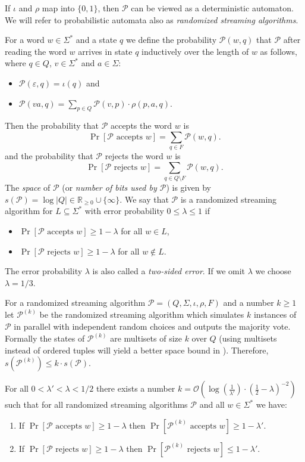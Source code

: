 \documentclass{article}\usepackage[a4paper,margin=20mm]{geometry}
\renewcommand{\O}{\mathcal{O}}
\renewcommand{\P}{\mathcal{P}}
\renewcommand{\geq}{\geqslant}
\renewcommand{\leq}{\leqslant}
\renewcommand{\ge}{\geq}
\renewcommand{\le}{\leq}
\begin{document}
If $\iota$ and $\rho$ map into $\{0,1\}$, then $\P$ can be viewed as a deterministic automaton.
We will refer to probabilistic automata also as \emph{randomized streaming algorithms}. 

For a word $w \in \Sigma^*$ and a state $q$ we define the probability $\P(w,q)$ that $\P$ after reading the word $w$ arrives
in state $q$ inductively over the length of $w$ as follows, where $q \in Q$, $v \in \Sigma^*$ and $a \in \Sigma$:
\begin{itemize}
\item $\P(\varepsilon,q) = \iota(q)$ and
\item $\P(va,q) = \sum_{p \in Q} \P(v,p) \cdot \rho(p,a,q)$.
\end{itemize}
Then the probability that $\P$ accepts the word $w$ is 
\[ \Pr[\P \text{ accepts } w] = \sum_{q \in F} \P(w,q).\] 
and the probability
that $\P$ rejects the word $w$ is 
\[ \Pr[\P \text{ rejects } w] = \sum_{q \in Q \setminus F} \P(w,q).\]
The {\em space} of $\P$ (or {\em number of bits used by $\P$}) is given by
$s(\P) = \log |Q| \in \mathbb{R}_{\ge 0} \cup \{ \infty \}$.
We say that $\P$ is a randomized streaming algorithm for $L \subseteq \Sigma^*$
with error probability $0 \le \lambda \le 1$ if
\begin{itemize}
\item $\Pr[\P \text{ accepts } w]  \ge 1 - \lambda$ for all $w \in L$,
\item $\Pr[\P \text{ rejects } w]  \ge 1 - \lambda$  for all $w \notin L$.
\end{itemize}
The error probability $\lambda$ is also called a {\em two-sided error}.
If we omit $\lambda$ we choose $\lambda = 1/3$.

For a randomized streaming algorithm $\P = (Q,\Sigma,\iota,\rho,F)$ and a number $k \ge 1$
let $\P^{(k)}$ be the randomized streaming algorithm which simulates $k$ instances of $\P$
in parallel with independent random choices and outputs the majority vote.
Formally the states of $\P^{(k)}$ are multisets of size $k$ over $Q$ (using multisets instead of 
ordered tuples will yield a better space bound in ).
Therefore, $s(\P^{(k)}) \le k \cdot s(\P)$.

\begin{lemma}
	\label{lem:amplification}
	For all $0 < \lambda' < \lambda < 1/2$ there exists a number
	$k = \O(\log \left( \frac{1}{\lambda'} \right) \cdot \left(\frac{1}{2}-\lambda\right)^{-2})$
	such that
	for all randomized streaming algorithms $\P$ and all $w \in \Sigma^*$ we have:
	\begin{enumerate}[label=(\roman{*}), ref=(\roman{*})]
	\item If $\Pr[\P \text{ accepts } w]  \ge 1-\lambda$ then
	$\Pr[\P^{(k)} \text{ accepts } w] \ge 1-\lambda'$.
	\item If $\Pr[\P \text{ rejects } w]  \ge 1-\lambda$ then
	$\Pr[\P^{(k)} \text{ rejects } w] \le 1-\lambda'$.
	\end{enumerate}
\end{lemma}
\end{document}
